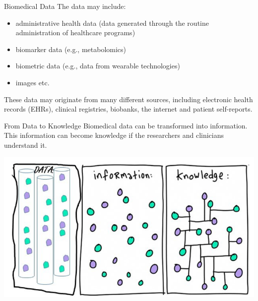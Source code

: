\documentclass[
  ignorenonframetext,
]{beamer}
\providecommand{\tightlist}{%
  \setlength{\itemsep}{0pt}\setlength{\parskip}{0pt}}\usepackage{longtable,booktabs,array}
\begin{document}
\begin{frame}{Biomedical Data}
\protect\hypertarget{biomedical-data}{}
The data may include:

\begin{itemize}
\tightlist
\item
  {administrative} health data (data generated through the routine
  administration of healthcare programs)
\item
  {biomarker} data (e.g., metabolomics)
\item
  {biometric} data (e.g., data from wearable technologies)
\item
  {images} etc.
\end{itemize}

These data may originate from many different sources, including
{electronic health records (EHRs), clinical registries, biobanks, the
internet and patient self-reports}.
\end{frame}

\begin{frame}{From Data to Knowledge}
\protect\hypertarget{from-data-to-knowledge}{}
Biomedical data can be transformed into {information}. This information
can become {knowledge} if the researchers and clinicians understand it.

\includegraphics{images_slides/info.png}
\end{frame}
\end{document}
